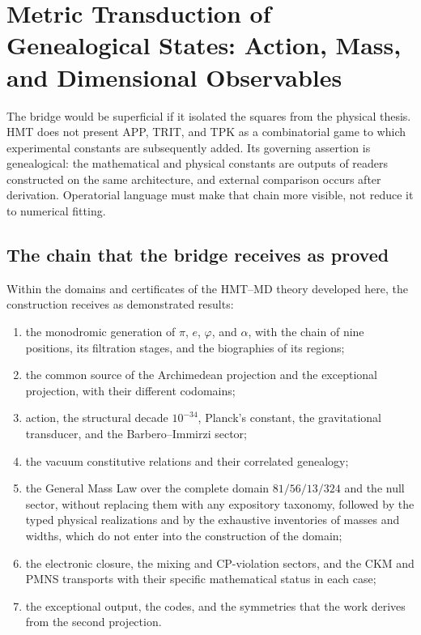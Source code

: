 \section{Metric Transduction of Genealogical States: Action, Mass, and Dimensional Observables}
\label{gmc:chap:programa}

The bridge would be superficial if it isolated the squares from the physical thesis. HMT
does not present APP, TRIT, and TPK as a combinatorial game to which experimental
constants are subsequently added. Its governing assertion is genealogical: the
mathematical and physical constants are outputs of readers constructed on the
same architecture, and external comparison occurs after derivation.
Operatorial language must make that chain more visible, not reduce it to
numerical fitting.

\subsection{The chain that the bridge receives as proved}

Within the domains and certificates of the HMT--MD theory developed here,
the construction receives as
demonstrated results:

\begin{enumerate}
 \item the monodromic generation of $\pi$, $e$, $\varphi$, and $\alpha$, with
 the chain of nine positions, its filtration stages, and the biographies of
 its regions;
 \item the common source of the Archimedean projection and the exceptional
 projection, with their different codomains;
 \item action, the structural decade $10^{-34}$, Planck's constant,
 the gravitational transducer, and the Barbero--Immirzi sector;
 \item the vacuum constitutive relations and their correlated genealogy;
 \item the General Mass Law over the complete domain
 $81/56/13/324$ and the null sector, without replacing them with any expository taxonomy, followed by the typed physical
 realizations and by the exhaustive inventories of masses and widths, which do not
 enter into the construction of the domain;
 \item the electronic closure, the mixing and CP-violation sectors, and
the CKM and PMNS transports with their specific mathematical status in
each case;
 \item the exceptional output, the codes, and the symmetries that the work
 derives from the second projection.
\end{enumerate}

